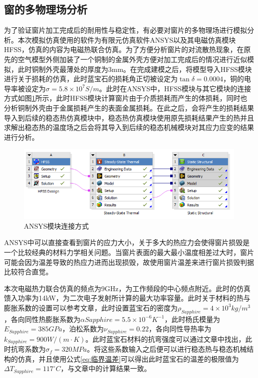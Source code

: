 \documentclass[master]{thesis-uestc}
\begin{document}
\subsection{窗的多物理场分析}
为了验证窗片加工完成后的耐用性与稳定性，有必要对窗片的多物理场进行模拟分析。本次模拟仿真使用的软件为有限元仿真软件ANSYS以及其电磁仿真模块HFSS，仿真的内容为电磁热联合仿真。为了方便分析窗片的对流散热现象，在原先的空气模型外侧加装了一个铜制的金属外壳方便对加工完成后的情况进行近似模拟，此时铜制外壳最薄处的厚度为3mm。在完成建模之后，将模型导入HFSS模块进行关于损耗的仿真，此时蓝宝石的损耗角正切被设定为\(\tan \delta = 0.0004\)，铜的电导率被设定为\(\sigma = 5.8 \times 10^7 S/m\)。此时在ANSYS中，HFSS模块与其它模块的连接方式如图\ref{fig:ANSYSHFSS连接}所示，此时HFSS模块计算窗片由于介质损耗而产生的体损耗，同时也分析铜制外壳由于金属损耗产生的表面金属损耗。在此之后，会将产生的损耗结果导入到后续的稳态热仿真模块中，稳态热仿真模块使用原先损耗结果产生的热并且求解出稳态热的温度场之后会将其导入到后续的稳态机械模块对其应力应变的结果进行分析。
\begin{figure}[!htb]
    \centering
    \includegraphics[width=0.5\linewidth]{pic/chapter3/HFSS-ANSYS模块组织.png}
    \caption{ANSYS模块连接方式}
    \label{fig:ANSYSHFSS连接}
\end{figure}

ANSYS中可以直接查看到窗片的应力大小，关于多大的热应力会使得窗片损毁是一个比较经典的材料力学相关问题。当窗片表面的最大最小温度相差过大时，窗片可能会因为温差导致的热应力进而出现损毁，故使用窗片温差来进行窗片损毁判据比较符合直觉。

本次电磁热力联合仿真的频点为9GHz，为工作频段的中心频点附近。此时的仿真馈入功率为14kW，为二次电子发射所计算的最大功率容量。此时关于材料的热与膨胀系数的设置可以参考文章\cite{thumm_stateart_2020}，此时设置蓝宝石的密度为\( \rho_{Sapphire}= 4 \times 10^3 kg/ m^3\)，各向同性热膨胀系数为\(\alpha{Sapphire} = 5.5 \times 10 ^{-6}K^{-1}\)，此时杨氏模量为\( E_{Sapphire}= 385 GPa \)，泊松系数为\( \nu_{Sapphire}= 0.22 \)，各向同性导热率为\(k_{Sapphire} =900 W/(m \cdot K)\)。此时蓝宝石材料的抗弯强度可以通过文章\cite{hanyong_diff_2011}中找出，此时抗弯系数为\(\sigma_{f} = 320MPa\)。将这些系数输入之后便可以进行稳态热与稳态机械结构的仿真，并且使用公式\ref{eq:临界温差}可以得出此时蓝宝石的温差的极限值为\(\Delta T_{Sapphire} = 117 ^\circ C\)，与文章中\cite{han_sapphire_2011}的计算结果一致。
\end{document}
